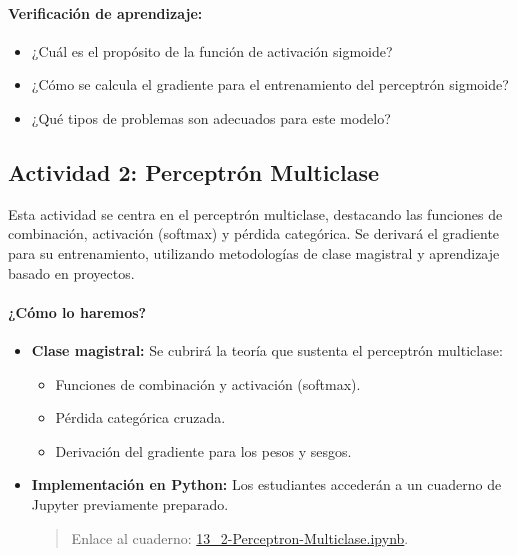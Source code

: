 \documentclass[a4,11pt]{aleph-notas}
\begin{document}
\paragraph{Verificación de aprendizaje:}  
\begin{itemize}[leftmargin=*]
    \item ¿Cuál es el propósito de la función de activación sigmoide?
    \item ¿Cómo se calcula el gradiente para el entrenamiento del perceptrón sigmoide?
    \item ¿Qué tipos de problemas son adecuados para este modelo?
\end{itemize}

\subsection*{Actividad 2: Perceptrón Multiclase}

Esta actividad se centra en el perceptrón multiclase, destacando las funciones de combinación, activación (softmax) y pérdida categórica. Se derivará el gradiente para su entrenamiento, utilizando metodologías de clase magistral y aprendizaje basado en proyectos.

\paragraph{¿Cómo lo haremos?}  
\begin{itemize}[leftmargin=*]
    \item \textbf{Clase magistral:} Se cubrirá la teoría que sustenta el perceptrón multiclase:
    \begin{itemize}
        \item Funciones de combinación y activación (softmax).
        \item Pérdida categórica cruzada.
        \item Derivación del gradiente para los pesos y sesgos.
    \end{itemize}
    \item \textbf{Implementación en Python:} Los estudiantes accederán a un cuaderno de Jupyter previamente preparado.
    \begin{quote}
        Enlace al cuaderno: \href{https://colab.research.google.com/github/andres-merino/AprendizajeAutomaticoInicial-05-N0105/blob/main/2-Notebooks/13_2-Perceptron-Multiclase.ipynb}{13\_2-Perceptron-Multiclase.ipynb}.
    \end{quote}
\end{itemize}
\end{document}
